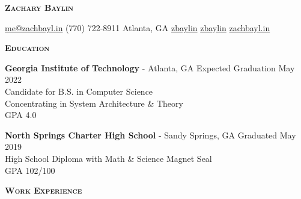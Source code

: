\documentclass{article}
\newcommand{\sectionHeader}[1]{{\large \textbf{\textsc{#1}}}\hspace{5pt}\xrfill[.5ex]{.4pt}}
\begin{document}
  \begin{center}
    {\LARGE \textbf{\textsc{Zachary Baylin}}}

    \vspace{2pt}

    \href{mailto:me@zachbayl.in}{\faEnvelope \hspace{1pt} me@zachbayl.in} \hspace{3pt} \faPhone \hspace{1pt} (770) 722-8911 \hspace{3pt}  Atlanta, GA \hspace{3pt} \href{https://linkedin.com/in/zbaylin}{\faLinkedin \hspace{1pt} zbaylin} \hspace{3pt} \href{https://github.com/zbaylin}{\faGithub \hspace{1pt} zbaylin} \hspace{3pt} \href{http://zachbayl.in}{\faGlobeAmericas \hspace{1pt} zachbayl.in}\\
  \end{center}

  \sectionHeader{Education}

  \vspace{3pt}

  \textbf{Georgia Institute of Technology} - Atlanta, GA \hspace*{\fill}Expected Graduation May 2022\\
  Candidate for B.S. in Computer Science\\
  Concentrating in System Architecture \& Theory\\
  GPA 4.0

  \vspace{5pt}

  \textbf{North Springs Charter High School} - Sandy Springs, GA \hspace*{\fill}Graduated May 2019\\
  High School Diploma with Math \& Science Magnet Seal\\
  GPA 102/100

  \vspace{8pt}

  \sectionHeader{Work Experience}

  \vspace{3pt}
\end{document}
